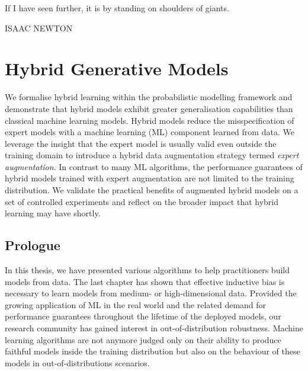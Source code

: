 \null\vfill
{\centering
\parbox{\textwidth}{%
  \raggedright
  {%

   If I have seen further, it is by standing on shoulders of giants.\par\bigskip
  }
  \raggedleft\MakeUppercase{Isaac Newton}\par%
}}

\vfill\vfill

\chapter{Hybrid Generative Models}\label{ch:07}

\begin{chapter_outline}

We formalise hybrid learning within the probabilistic modelling framework and demonstrate that hybrid models exhibit greater generalisation capabilities than classical machine learning models.
Hybrid models reduce the misspecification of expert models with a machine learning (ML) component learned from data. We leverage the insight that the expert model is usually valid even outside the training domain to introduce a hybrid data augmentation strategy termed \textit{expert augmentation}. In contrast to many ML algorithms, the performance guarantees of hybrid models trained with expert augmentation are not limited to the training distribution. We validate the practical benefits of augmented hybrid models on a set of controlled experiments and reflect on the broader impact that hybrid learning may have shortly.

\end{chapter_outline}

\section{Prologue}
In this thesis, we have presented various algorithms to help practitioners build models from data. The last chapter has shown that effective inductive bias is necessary to learn models from medium- or high-dimensional data. Provided the growing application of ML in the real world and the related demand for performance guarantees throughout the lifetime of the deployed models, our research community has gained interest in out-of-distribution robustness. Machine learning algorithms are not anymore judged only on their ability to produce faithful models inside the training distribution but also on the behaviour of these models in out-of-distributions scenarios.


